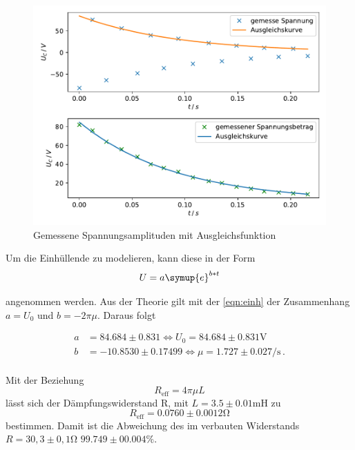 \newpage
\begin{figure}
    \centering
    \label{fig:1}
    \includegraphics{Daten/a.pdf}
    \caption{Gemessene Spannungsamplituden mit Ausgleichsfunktion}
\end{figure}

Um die Einhüllende zu modelieren, kann diese in der Form
\begin{equation}
    U = a \symup{e}^{b*t}
\end{equation}

\noindent
angenommen werden. Aus der Theorie gilt mit der \autoref{eqn:einh} der Zusammenhang $a = U_0$ und $b = -2 \pi \mu$. Daraus folgt %


\begin{align*}
    a &= 84.684 \pm 0.831 \Leftrightarrow U_0 = 84.684 \pm 0.831 \si{\volt} \\
    b &= -10.8530 \pm 0.17499 \Leftrightarrow \mu = 1.727 \pm 0.027 \si{\per\second} \, .\\
\end{align*}

Mit der Beziehung 
\begin{equation}
    R_\text{eff} = 4\pi\mu L 
\end{equation}
lässt sich der Dämpfungswiderstand R, mit $L = 3.5 \pm 0.01 \si{\milli\henry}$ zu
\begin{equation*}
    R_\text{eff} = 0.0760 \pm 0.0012 \si{\ohm}
\end{equation*}
bestimmen. Damit ist die Abweichung des im verbauten Widerstands $R = 30,3 \pm 0,1 \si{\ohm}$ $99.749 \pm 00.004 \si{\percent}$.

